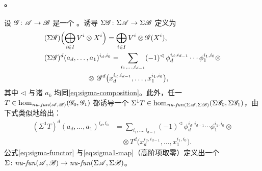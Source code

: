 \paragraph{\trFunctoriality。}\label{sub:functoriality}
设 $\mathscr{G}\colon\mathscr{A}\to\mathscr{B}$ 是一个\trNonunital{} \trAFunctor。诱导\trFunctor{}%
$\Sigma\mathscr{G}\colon\Sigma\mathscr{A}\to\Sigma\mathscr{B}$ 定义为
\begin{equation}\label{eq:sigma-functor}
\begin{aligned}
&(\Sigma\mathscr{G})\Bigl(\bigoplus_{i\in I}V^i\otimes X^i\Bigr)
=\bigoplus_{i\in I}V^i\otimes\mathscr{G}(X^i),\\
&(\Sigma\mathscr{G})^d(a_d,\ldots,a_1)^{i_d,i_0}
=\sum_{i_1,\ldots,i_{d-1}}(-1)^{\lhd}\,
\phi_d^{i_d,i_{d-1}}\cdots\phi_1^{i_1,i_0}\otimes\\
&\hspace{6em}\otimes\,\mathscr{G}^d\bigl(x_d^{i_d,i_{d-1}},\ldots,x_1^{i_1,i_0}\bigr),
\end{aligned}
\end{equation}
其中 $\lhd$ 与诸 $a_k$ 均同\eqref{eq:sigma-composition}。此外，任一
$T\in\hom_{\mathit{nu}\text{-}\mathit{fun}(\mathscr{A},\mathscr{B})}(\mathscr{G}_0,\mathscr{G}_1)$
都诱导一个
$\Sigma^1T\in\hom_{\mathit{nu}\text{-}\mathit{fun}(\Sigma\mathscr{A},\Sigma\mathscr{B})}
(\Sigma\mathscr{G}_0,\Sigma\mathscr{G}_1)$，由下式类似地给出：
\begin{equation}\label{eq:sigma1-map}
\begin{split}
(\Sigma^1T)^d(a_d,\ldots,a_1)^{i_d,i_0}
&=\sum_{i_1,\ldots,i_{d-1}}(-1)^{\lhd}\,
\phi_d^{i_d,i_{d-1}}\cdots\phi_1^{i_1,i_0}\otimes\\
&\quad\otimes T^d\bigl(x_d^{i_d,i_{d-1}},\ldots,x_1^{i_1,i_0}\bigr).
\end{split}
\end{equation}
公式\eqref{eq:sigma-functor} 与\eqref{eq:sigma1-map}（高阶项取零）定义出一个%
\trNonunital{} \trAFunctor{}%
$\Sigma\colon\mathit{nu}\text{-}\mathit{fun}(\mathscr{A},\mathscr{B})\to
\mathit{nu}\text{-}\mathit{fun}(\Sigma\mathscr{A},\Sigma\mathscr{B})$。

